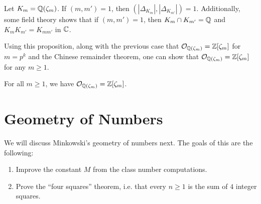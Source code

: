 \begin{remark}
  Let $K_m = \mathbb{Q}(\zeta_m)$. If $(m, m') = 1$, then
  $(|\Delta_{K_m}|, |\Delta_{K_{m'}}|) = 1$.
  Additionally, some field theory shows that
  if $(m, m') = 1$,
  then $K_m \cap K_{m'} = \mathbb{Q}$ and
  $K_m K_{m'} = K_{mm'}$ in $\mathbb{C}$.

  Using this proposition, along with the previous
  case that $\mathcal{O}_{\mathbb{Q}(\zeta_m)} = \mathbb{Z}[\zeta_m]$ for
  $m = p^k$ and the Chinese
  remainder theorem,
  one can show that $\mathcal{O}_{\mathbb{Q}(\zeta_m)} = \mathbb{Z}[\zeta_m]$
  for any $m \ge 1$.
\end{remark}

\begin{corollary}
  For all $m \ge 1$, we have
  $\mathcal{O}_{\mathbb{Q}(\zeta_m)} = \mathbb{Z}[\zeta_m]$.
\end{corollary}

\section{Geometry of Numbers}

\begin{remark}
  We will discuss Minkowski's geometry of numbers next.
  The goals of this are the following:
  \begin{enumerate}
    \item Improve the constant $M$ from the class
      number computations.
    \item Prove the ``four squares'' theorem, i.e.
      that every $n \ge 1$ is the sum of $4$ integer
      squares.
  \end{enumerate}
\end{remark}
